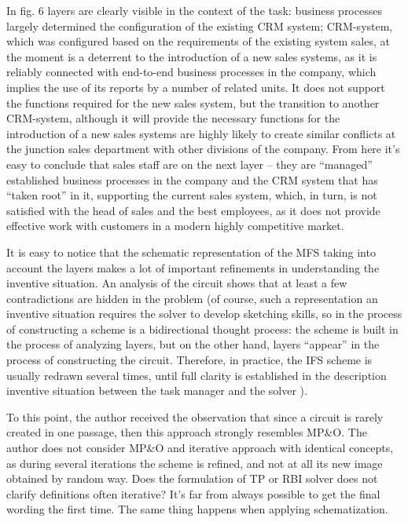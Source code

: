 In fig. 6 layers are clearly visible in the context of the task: business
processes largely determined the configuration of the existing CRM system;
CRM-system, which was configured based on the requirements of the existing
system sales, at the moment is a deterrent to the introduction of a new sales
systems, as it is reliably connected with end-to-end business processes in the
company, which implies the use of its reports by a number of related units.
It does not support the functions required for the new sales system, but the
transition to another CRM-system, although it will provide the necessary
functions for the introduction of a new sales systems are highly likely to
create similar conflicts at the junction sales department with other divisions
of the company. From here it’s easy to conclude that sales staff are on the
next layer -- they are “managed” established business processes in the company
and the CRM system that has “taken root” in it, supporting the current sales
system, which, in turn, is not satisfied with the head of sales and the best
employees, as it does not provide effective work with customers in a modern
highly competitive market.

It is easy to notice that the schematic representation of the MFS taking into
account the layers makes a lot of important refinements in understanding the
inventive situation. An analysis of the circuit shows that at least a few
contradictions are hidden in the problem (of course, such a representation an
inventive situation requires the solver to develop sketching skills, so in the
process of constructing a scheme is a bidirectional thought process: the
scheme is built in the process of analyzing layers, but on the other hand,
layers “appear” in the process of constructing the circuit. Therefore, in
practice, the IFS scheme is usually redrawn several times, until full clarity
is established in the description inventive situation between the task manager
and the solver ).

To this point, the author received the observation that since a circuit is
rarely created in one passage, then this approach strongly resembles MP\&O.
The author does not consider MP\&O and iterative approach with identical
concepts, as during several iterations the scheme is refined, and not at all
its new image obtained by random way. Does the formulation of TP or RBI solver
does not clarify definitions often iterative? It’s far from always possible to
get the final wording the first time. The same thing happens when applying
schematization.

